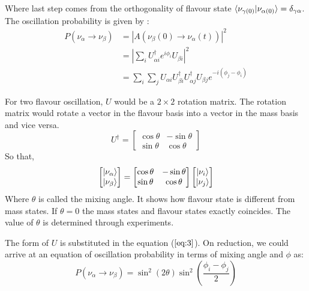 \documentclass[12pt,a4paper]{report}
\begin{document}
Where last step comes from the orthogonality of flavour state $\braket{\nu_{\gamma(0)}|\nu_{\alpha(0)}}=\delta_{\gamma\alpha}$. 
The oscillation probability is given by :
\begin{equation}
\label{eq:3}
\begin{split}
P(\nu_{\alpha} \rightarrow\nu_{\beta})& =|A(\nu_{\beta}(0)\rightarrow\nu_{\alpha}(t))|^{2}\\
&=|\sum_{i}U_{\alpha i}^{\dagger} e^{i\phi_{i}}U_{\beta i}|^{2}\\
&=\sum_{i}\sum_{j}U_{\alpha i} U_{\beta i}^{\dagger} U_{\alpha j }^{\dagger}U_{\beta j}e^{-i(\phi_{j}-\phi_{i})}
\end{split}
\end{equation}

For two flavour oscillation, $U$ would be a $2\times2$ rotation matrix. The rotation matrix would rotate a vector in the flavour basis into a vector in the mass basis and vice versa.
\begin{equation}
U^{\dagger}=\begin{bmatrix}\cos\theta & -\sin\theta \\ \sin\theta & \cos\theta \end{bmatrix}	
\end{equation}
So that,
\begin{equation}
\begin{bmatrix} \ket{\nu_{\alpha}} \\ \ket{\nu_{\beta}} \end{bmatrix} = \begin{bmatrix} \cos\theta & -\sin\theta \\ \sin\theta & \cos\theta \end{bmatrix}\begin{bmatrix} \ket{\nu_{i}} \\ \ket{\nu_{j}}
\end{bmatrix}
\end{equation}
Where $\theta$ is called the mixing angle. It shows how flavour state is different from mass states. If $\theta=0$ the mass states and flavour states exactly coincides. The value of $\theta$ is determined through experiments.\par 
The form of $U$ is substituted in the equation ($\ref{eq:3}$). On reduction, we could arrive at an equation of oscillation probability in terms of mixing angle and $\phi$ as:
\begin{equation}
\label{eq:3a}
P(\nu_{\alpha} \rightarrow \nu_{\beta}) = \sin^{2}\left(2\theta\right)\sin^{2}\left(\frac{\phi_{i}-\phi_{j}}{2}\right)
\end{equation}
\end{document}
